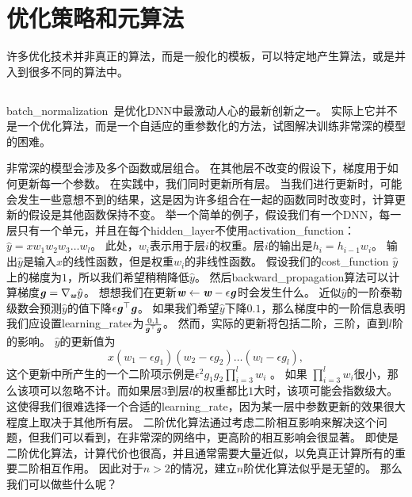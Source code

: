 
\section{优化策略和元算法}
\label{sec:optimization_strategies_and_meta_algorithms}
许多优化技术并非真正的算法，而是一般化的模板，可以特定地产生算法，或是并入到很多不同的算法中。

\subsection{}
\label{sec:batch_normalization}
\gls{batch_normalization}~\citep{Ioffe+Szegedy-2015}是优化\gls{DNN}中最激动人心的最新创新之一。
实际上它并不是一个优化算法，而是一个自适应的重参数化的方法，试图解决训练非常深的模型的困难。

非常深的模型会涉及多个函数或层组合。
在其他层不改变的假设下，梯度用于如何更新每一个参数。
在实践中，我们同时更新所有层。
当我们进行更新时，可能会发生一些意想不到的结果，这是因为许多组合在一起的函数同时改变时，计算更新的假设是其他函数保持不变。
举一个简单的例子，假设我们有一个\gls{DNN}，每一层只有一个单元，并且在每个\gls{hidden_layer}不使用\gls{activation_function}：$\hat{y} = xw_1 w_2 w_3 \dots w_l$。
此处，$w_i$表示用于层$i$的权重。层$i$的输出是$h_i = h_{i-1} w_i$。
输出$\hat{y}$是输入$x$的线性函数，但是权重$w_i$的非线性函数。
假设我们的\gls{cost_function} $\hat{y}$上的梯度为$1$，所以我们希望稍稍降低$\hat{y}$。
然后\gls{backward_propagation}算法可以计算梯度$\boldsymbol{\mathit{g}} = \nabla_{\boldsymbol{\mathit{w}}} \hat{y}$。
想想我们在更新$\boldsymbol{\mathit{w}} \leftarrow \boldsymbol{\mathit{w}} - \epsilon \boldsymbol{\mathit{g}}$时会发生什么。
近似$\hat{y}$的一阶泰勒级数会预测$\hat{y}$的值下降$\epsilon \boldsymbol{\mathit{g}}^\top \boldsymbol{\mathit{g}}$。
如果我们希望$\hat{y}$下降$0.1$，那么梯度中的一阶信息表明我们应设置\gls{learning_rate}$\epsilon$为$\frac{0.1}{\boldsymbol{\mathit{g}}^\top \boldsymbol{\mathit{g}}}$。
然而，实际的更新将包括二阶，三阶，直到$l$阶的影响。
$\hat{y}$的更新值为
\begin{equation}
    x(w_1-\epsilon g_1)(w_2-\epsilon g_2)\dots(w_l-\epsilon g_l),
\end{equation}
这个更新中所产生的一个二阶项示例是$\epsilon^2 g_1 g_2 \prod_{i=3}^l w_i$ 。
如果 $\prod_{i=3}^l w_i$很小，那么该项可以忽略不计。而如果层$3$到层$l$的权重都比$1$大时，该项可能会指数级大。
这使得我们很难选择一个合适的\gls{learning_rate}，因为某一层中参数更新的效果很大程度上取决于其他所有层。
二阶优化算法通过考虑二阶相互影响来解决这个问题，但我们可以看到，在非常深的网络中，更高阶的相互影响会很显著。
即使是二阶优化算法，计算代价也很高，并且通常需要大量近似，以免真正计算所有的重要二阶相互作用。
因此对于$n>2$的情况，建立$n$阶优化算法似乎是无望的。
那么我们可以做些什么呢？

